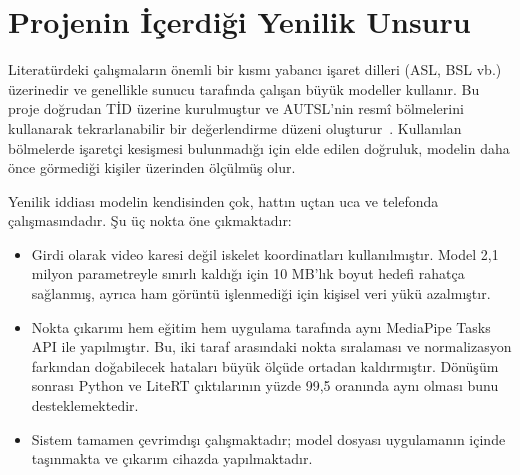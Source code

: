 \section{Projenin İçerdiği Yenilik Unsuru}
\label{UcuncuBolum}

Literatürdeki çalışmaların önemli bir kısmı yabancı işaret dilleri (ASL, BSL vb.)
üzerinedir ve genellikle sunucu tarafında çalışan büyük modeller kullanır. Bu
proje doğrudan TİD üzerine kurulmuştur ve AUTSL'nin resmî bölmelerini kullanarak
tekrarlanabilir bir değerlendirme düzeni oluşturur~\cite{AUTSL2020}. Kullanılan
bölmelerde işaretçi kesişmesi bulunmadığı için elde edilen doğruluk, modelin daha
önce görmediği kişiler üzerinden ölçülmüş olur.

Yenilik iddiası modelin kendisinden çok, hattın uçtan uca ve telefonda
çalışmasındadır. Şu üç nokta öne çıkmaktadır:

\begin{itemize}
  \item Girdi olarak video karesi değil iskelet koordinatları kullanılmıştır.
        Model 2,1 milyon parametreyle sınırlı kaldığı için 10 MB'lık boyut hedefi
        rahatça sağlanmış, ayrıca ham görüntü işlenmediği için kişisel veri yükü
        azalmıştır.
  \item Nokta çıkarımı hem eğitim hem uygulama tarafında aynı MediaPipe Tasks API
        ile yapılmıştır. Bu, iki taraf arasındaki nokta sıralaması ve
        normalizasyon farkından doğabilecek hataları büyük ölçüde ortadan
        kaldırmıştır. Dönüşüm sonrası Python ve LiteRT çıktılarının yüzde 99,5
        oranında aynı olması bunu desteklemektedir.
  \item Sistem tamamen çevrimdışı çalışmaktadır; model dosyası uygulamanın içinde
        taşınmakta ve çıkarım cihazda yapılmaktadır.
\end{itemize}
